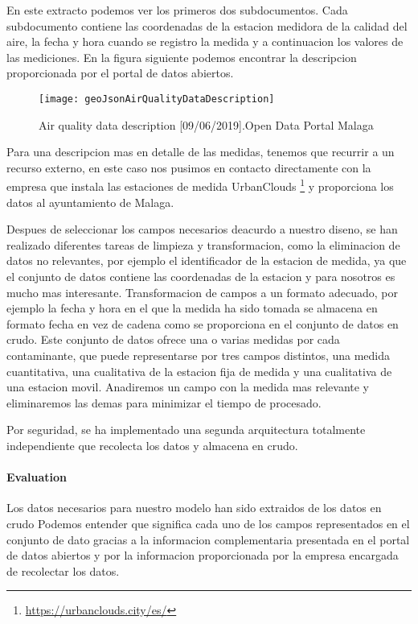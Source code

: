 En este extracto podemos ver los primeros dos subdocumentos. Cada subdocumento contiene las coordenadas de la estacion medidora de la calidad
del aire, la fecha y hora cuando se registro la medida y a continuacion los valores de las mediciones. 
En la figura siguiente podemos encontrar la descripcion proporcionada por el portal de datos abiertos.
\begin{figure}[ht]
    \centering
    \texttt{[image: geoJsonAirQualityDataDescription]}
    \caption{Air quality data description [09/06/2019].Open Data Portal Malaga}
\end{figure}



Para una descripcion mas en detalle de las medidas, tenemos que recurrir a un recurso externo, en este caso nos pusimos en contacto directamente con
la empresa que instala las estaciones de medida UrbanClouds \footnote{\url{https://urbanclouds.city/es/}} y proporciona los datos al ayuntamiento de Malaga.

Despues de seleccionar los campos necesarios deacurdo a nuestro diseno, se han realizado diferentes tareas de limpieza y transformacion,
como la eliminacion de datos no relevantes, por ejemplo el identificador de la estacion de medida, ya que el conjunto de datos
contiene las coordenadas de la estacion y para nosotros es mucho mas interesante.
Transformacion de campos a un formato adecuado, por ejemplo la fecha y hora en el que la medida ha sido tomada se almacena en formato fecha
en vez de cadena como se proporciona en el conjunto de datos en crudo.
Este conjunto de datos ofrece una o varias medidas por cada contaminante, que puede representarse por tres campos distintos, una medida 
cuantitativa, una cualitativa de la estacion fija de medida y una cualitativa de una estacion movil. Anadiremos un campo con la medida
mas relevante y eliminaremos las demas para minimizar el tiempo de procesado.

Por seguridad, se ha implementado una segunda arquitectura totalmente independiente que recolecta los datos y almacena en crudo.


\paragraph{Evaluation} \mbox{} 
\begin{itemize}
    \done Los datos necesarios para nuestro modelo han sido extraidos de los datos en crudo
    \done Podemos entender  que significa cada uno de los campos representados en el conjunto de dato gracias a la informacion
    complementaria presentada en el portal de datos abiertos y por la informacion proporcionada por la empresa encargada de 
    recolectar los datos.
    
\end{itemize}
\newpage
